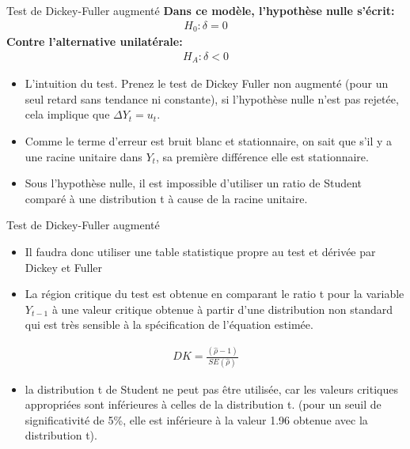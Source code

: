 \documentclass{beamer}
\begin{document}
\begin{frame}{Test de Dickey-Fuller augmenté}
\textbf{Dans ce modèle, l’hypothèse nulle  s’écrit:}
\begin{align*}
H_0:\delta =0
\end{align*}
\textbf{Contre l’alternative unilatérale:}
\begin{align*}
H_A:\delta<0
\end{align*}
\begin{itemize}
\item L’intuition du test. Prenez le test de Dickey Fuller non augmenté (pour un seul retard sans tendance ni constante), si l’hypothèse nulle n’est pas rejetée, cela implique que $\Delta Y_t= u_t$. 
\item Comme le terme d’erreur est bruit blanc et stationnaire, on sait que s’il y a une racine unitaire dans $Y_t$, sa première différence elle est stationnaire.
\item Sous l’hypothèse nulle, il est impossible d’utiliser un ratio de Student comparé à une distribution t à cause de la racine unitaire. 
\end{itemize}
\end{frame}

\begin{frame}{Test de Dickey-Fuller augmenté} 
\begin{itemize}
\item Il faudra donc utiliser une table statistique propre au test et dérivée par Dickey et Fuller
\item La région critique du test est obtenue en comparant le ratio t pour la variable $Y_{t-1}$ à une valeur critique obtenue à partir d’une distribution non standard qui est très sensible à la spécification de l’équation estimée.
\end{itemize}
\begin{align*}
DK=\frac{(\hat{\rho}-1)}{SE(\hat{\rho})}
\end{align*}
\begin{itemize}
\item la distribution t de Student ne peut pas être utilisée, car les valeurs critiques appropriées sont inférieures à celles de la distribution t. (pour un seuil de significativité de 5\%, elle est inférieure à la valeur 1.96 obtenue avec la distribution t). 
\end{itemize}
\end{frame}
\end{document}
